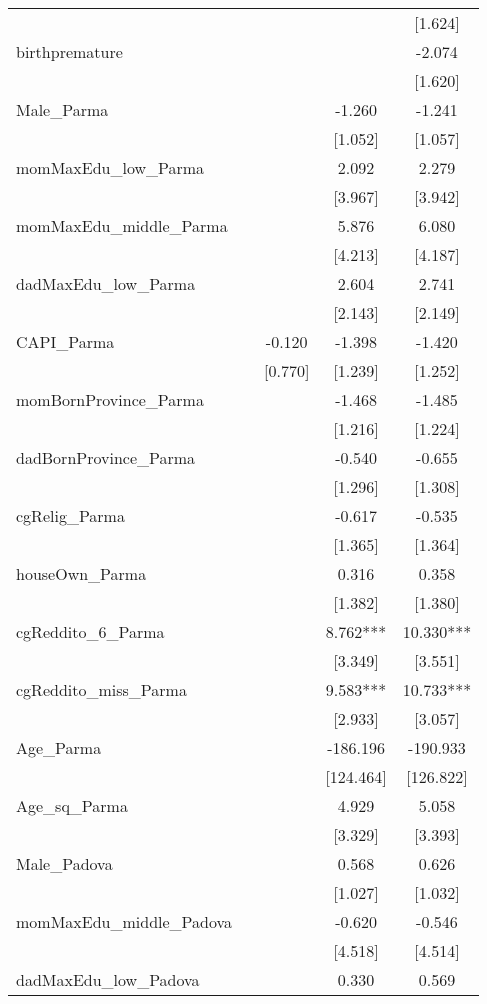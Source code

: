 \documentclass[]{article}
\begin{document}
\begin{tabular}{lcccc}
 &  &  &  & [1.624] \\
birthpremature &  &  &  & -2.074 \\
 &  &  &  & [1.620] \\
Male\_Parma &  &  & -1.260 & -1.241 \\
 &  &  & [1.052] & [1.057] \\
momMaxEdu\_low\_Parma &  &  & 2.092 & 2.279 \\
 &  &  & [3.967] & [3.942] \\
momMaxEdu\_middle\_Parma &  &  & 5.876 & 6.080 \\
 &  &  & [4.213] & [4.187] \\
dadMaxEdu\_low\_Parma &  &  & 2.604 & 2.741 \\
 &  &  & [2.143] & [2.149] \\
CAPI\_Parma &  & -0.120 & -1.398 & -1.420 \\
 &  & [0.770] & [1.239] & [1.252] \\
momBornProvince\_Parma &  &  & -1.468 & -1.485 \\
 &  &  & [1.216] & [1.224] \\
dadBornProvince\_Parma &  &  & -0.540 & -0.655 \\
 &  &  & [1.296] & [1.308] \\
cgRelig\_Parma &  &  & -0.617 & -0.535 \\
 &  &  & [1.365] & [1.364] \\
houseOwn\_Parma &  &  & 0.316 & 0.358 \\
 &  &  & [1.382] & [1.380] \\
cgReddito\_6\_Parma &  &  & 8.762*** & 10.330*** \\
 &  &  & [3.349] & [3.551] \\
cgReddito\_miss\_Parma &  &  & 9.583*** & 10.733*** \\
 &  &  & [2.933] & [3.057] \\
Age\_Parma &  &  & -186.196 & -190.933 \\
 &  &  & [124.464] & [126.822] \\
Age\_sq\_Parma &  &  & 4.929 & 5.058 \\
 &  &  & [3.329] & [3.393] \\
Male\_Padova &  &  & 0.568 & 0.626 \\
 &  &  & [1.027] & [1.032] \\
momMaxEdu\_middle\_Padova &  &  & -0.620 & -0.546 \\
 &  &  & [4.518] & [4.514] \\
dadMaxEdu\_low\_Padova &  &  & 0.330 & 0.569 \\

\end{tabular}
\end{document}
